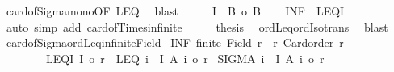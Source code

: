 \begin{isabellebody}
\ card{\isacharunderscore}{\kern0pt}of{\isacharunderscore}{\kern0pt}Sigma{\isacharunderscore}{\kern0pt}mono{}{\isacharbrackleft}{\kern0pt}OF\ LEQ{\isacharbrackright}{\kern0pt}\ \isamarkupfalse%
\ blast\isanewline
\ \ \isamarkupfalse%
\ \isamarkupfalse%
\ {\isachardoublequoteopen}{\isacharbar}{\kern0pt}I\ {\isasymtimes}\ B{\isacharbar}{\kern0pt}\ {\isacharequal}{\kern0pt}o\ {\isacharbar}{\kern0pt}B{\isacharbar}{\kern0pt}{\isachardoublequoteclose}\isanewline
\ \ \isamarkupfalse%
\ INF\ {\isacharasterisk}{\kern0pt}\ LEQ{\isacharunderscore}{\kern0pt}I\ \isamarkupfalse%
\ {\isacharparenleft}{\kern0pt}auto\ simp\ add{\isacharcolon}{\kern0pt}\ card{\isacharunderscore}{\kern0pt}of{\isacharunderscore}{\kern0pt}Times{\isacharunderscore}{\kern0pt}infinite{\isacharparenright}{\kern0pt}\isanewline
\ \ \isamarkupfalse%
\ \isamarkupfalse%
\ {\isacharquery}{\kern0pt}thesis\ \isamarkupfalse%
\ ordLeq{\isacharunderscore}{\kern0pt}ordIso{\isacharunderscore}{\kern0pt}trans\ \isamarkupfalse%
\ blast\isanewline
{}\isamarkupfalse%
%
\endisatagproof
{\isafoldproof}%
%
\isadelimproof
\isanewline
%
\endisadelimproof
\isanewline
{}\isamarkupfalse%
\ card{\isacharunderscore}{\kern0pt}of{\isacharunderscore}{\kern0pt}Sigma{\isacharunderscore}{\kern0pt}ordLeq{\isacharunderscore}{\kern0pt}infinite{\isacharunderscore}{\kern0pt}Field{\isacharcolon}{\kern0pt}\isanewline
{}\ INF{\isacharcolon}{\kern0pt}\ {\isachardoublequoteopen}{\isasymnot}finite\ {\isacharparenleft}{\kern0pt}Field\ r{\isacharparenright}{\kern0pt}{\isachardoublequoteclose}\ \ r{\isacharcolon}{\kern0pt}\ {\isachardoublequoteopen}Card{\isacharunderscore}{\kern0pt}order\ r{\isachardoublequoteclose}\ \isanewline
\ \ \ \ \ \ \ \ LEQ{\isacharunderscore}{\kern0pt}I{\isacharcolon}{\kern0pt}\ {\isachardoublequoteopen}{\isacharbar}{\kern0pt}I{\isacharbar}{\kern0pt}\ {\isasymle}o\ r{\isachardoublequoteclose}\ \ LEQ{\isacharcolon}{\kern0pt}\ {\isachardoublequoteopen}{\isasymforall}i\ {\isasymin}\ I{\isachardot}{\kern0pt}\ {\isacharbar}{\kern0pt}A\ i{\isacharbar}{\kern0pt}\ {\isasymle}o\ r{\isachardoublequoteclose}\isanewline
{}\ {\isachardoublequoteopen}{\isacharbar}{\kern0pt}SIGMA\ i\ {\isacharcolon}{\kern0pt}\ I{\isachardot}{\kern0pt}\ A\ i{\isacharbar}{\kern0pt}\ {\isasymle}o\ r{\isachardoublequoteclose}\isanewline
%
\isadelimproof
%
\endisadelimproof
%

\end{isabellebody}
